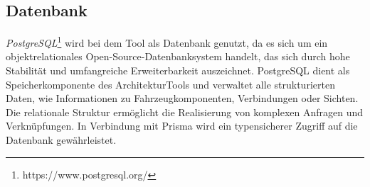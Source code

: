\subsection*{Datenbank}

\textit{PostgreSQL}\footnote{https://www.postgresql.org/} wird bei dem Tool als Datenbank genutzt, da es sich um ein objektrelationales Open-Source-Datenbanksystem handelt, das sich durch hohe Stabilität und umfangreiche Erweiterbarkeit auszeichnet. PostgreSQL dient als Speicherkomponente des ArchitekturTools und verwaltet alle strukturierten Daten, wie Informationen zu Fahrzeugkomponenten, Verbindungen oder Sichten. Die relationale Struktur ermöglicht die Realisierung von komplexen Anfragen und Verknüpfungen. In Verbindung mit Prisma wird ein typensicherer Zugriff auf die Datenbank gewährleistet.